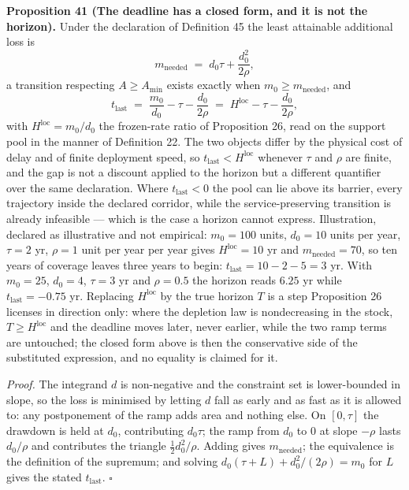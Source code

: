 \documentclass[11pt]{article}
\begin{document}
\textbf{Proposition 41 (The deadline has a closed form, and it is not the horizon).} Under the declaration of
Definition 45 the least attainable additional loss is
\[ m_{\mathrm{needed}} \;=\; d_0\tau + \frac{d_0^{2}}{2\rho} , \]
a transition respecting \(A \ge A_{\min}\) exists exactly when \(m_0 \ge m_{\mathrm{needed}}\), and
\[ t_{\mathrm{last}} \;=\; \frac{m_0}{d_0} - \tau - \frac{d_0}{2\rho} \;=\; H^{\mathrm{loc}} - \tau - \frac{d_0}{2\rho} , \]
with \(H^{\mathrm{loc}} = m_0/d_0\) the frozen-rate ratio of Proposition 26, read on the support pool in
the manner of Definition 22. The two objects differ by the
physical cost of delay and of finite deployment speed, so \(t_{\mathrm{last}} < H^{\mathrm{loc}}\) whenever
\(\tau\) and \(\rho\) are finite, and the gap is not a discount applied to the horizon but a different
quantifier over the same declaration. Where \(t_{\mathrm{last}} < 0\) the pool can lie above its barrier,
every trajectory inside the declared corridor, while the service-preserving transition is already
infeasible --- which is the case a horizon cannot express.
Illustration, declared as illustrative and not empirical: \(m_0 = 100\) units, \(d_0 = 10\) units per year,
\(\tau = 2\) yr, \(\rho = 1\) unit per year per year gives \(H^{\mathrm{loc}} = 10\) yr and \(m_{\mathrm{needed}} = 70\),
so ten years of coverage leaves three years to begin: \(t_{\mathrm{last}} = 10 - 2 - 5 = 3\) yr. With
\(m_0 = 25\), \(d_0 = 4\), \(\tau = 3\) yr and \(\rho = 0.5\) the horizon reads \(6.25\) yr while
\(t_{\mathrm{last}} = -0.75\) yr. Replacing \(H^{\mathrm{loc}}\) by the true horizon \(T\) is a step Proposition 26
licenses in direction only: where the depletion law is nondecreasing in the stock, \(T \ge H^{\mathrm{loc}}\)
and the deadline moves later, never earlier, while the two ramp terms are untouched; the closed form above is
then the conservative side of the substituted expression, and no equality is claimed for it.

\emph{Proof.} The integrand \(d\) is non-negative and the constraint set is lower-bounded in slope, so the loss is
minimised by letting \(d\) fall as early and as fast as it is allowed to: any postponement of the ramp adds
area and nothing else. On \([0, \tau]\) the drawdown is held at \(d_0\), contributing \(d_0 \tau\); the ramp from
\(d_0\) to \(0\) at slope \(-\rho\) lasts \(d_0/\rho\) and contributes the triangle \(\tfrac{1}{2} d_0^{2}/\rho\).
Adding gives \(m_{\mathrm{needed}}\); the equivalence is the definition of the supremum; and solving
\(d_0(\tau + L) + d_0^2/(2\rho) = m_0\) for \(L\) gives the stated \(t_{\mathrm{last}}\). \ensuremath{\square}
\end{document}
